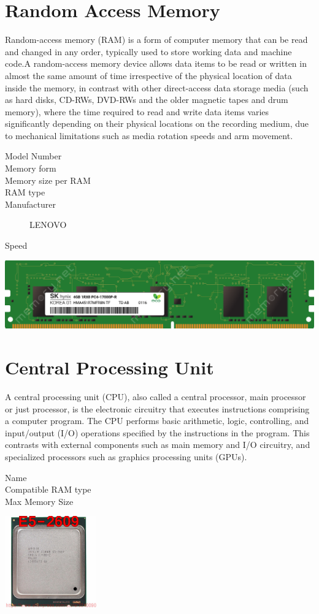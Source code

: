 \documentclass{article}
\begin{document}
\section{Random Access Memory}
Random-access memory (RAM) is a form of computer memory that can be read and changed in any order, typically used to store working data and machine code.A random-access memory device allows data items to be read or written in almost the same amount of time irrespective of the physical location of data inside the memory, in contrast with other direct-access data storage media (such as hard disks, CD-RWs, DVD-RWs and the older magnetic tapes and drum memory), where the time required to read and write data items varies significantly depending on their physical locations on the recording medium, due to mechanical limitations such as media rotation speeds and arm movement.
\begin{description}
 \item [Model Number] 
 \item [Memory form] 
 \item [Memory size per RAM] 
 \item [RAM type] 
 \item [Manufacturer]  LENOVO
 \item [Speed] 
\end{description}
\href{https://www.datasheets360.com/pdf/4058231500629532296}{\includegraphics[width=\textwidth]{RAM.png}}
\section{Central Processing Unit}
A central processing unit (CPU), also called a central processor, main processor or just processor, is the electronic circuitry that executes instructions comprising a computer program. The CPU performs basic arithmetic, logic, controlling, and input/output (I/O) operations specified by the instructions in the program. This contrasts with external components such as main memory and I/O circuitry, and specialized processors such as graphics processing units (GPUs).
\begin{description}
 \item [Name] 
 \item [Compatible RAM type] 
 \item [Max Memory Size] 
\end{description}
\href{http://static6.arrow.com/aropdfconversion/bc27610082f0c9042063be09408c62b0895fa247/pgurl_5465333946064300.pdf}{\includegraphics[height=4cm]{CPU.jpg}}
\end{document}
